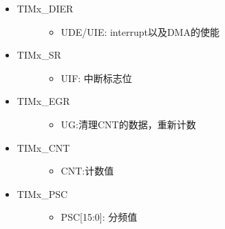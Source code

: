 \documentclass[letterpaper,10pt,english]{sphinxmanual}
\begin{document}
\begin{itemize}
\begin{description}
\begin{itemize}
\end{itemize}

\end{description}

\item {} \begin{description}
\item[{TIMx\_DIER}] \leavevmode\begin{itemize}
\item {} 
UDE/UIE: interrupt以及DMA的使能

\end{itemize}

\end{description}

\item {} \begin{description}
\item[{TIMx\_SR}] \leavevmode\begin{itemize}
\item {} 
UIF: 中断标志位

\end{itemize}

\end{description}

\item {} \begin{description}
\item[{TIMx\_EGR}] \leavevmode\begin{itemize}
\item {} 
UG:清理CNT的数据，重新计数

\end{itemize}

\end{description}

\item {} \begin{description}
\item[{TIMx\_CNT}] \leavevmode\begin{itemize}
\item {} 
CNT:计数值

\end{itemize}

\end{description}

\item {} \begin{description}
\item[{TIMx\_PSC}] \leavevmode\begin{itemize}
\item {} 
PSC{[}15:0{]}: 分频值


\end{itemize}
\end{description}
\end{itemize}
\end{document}

